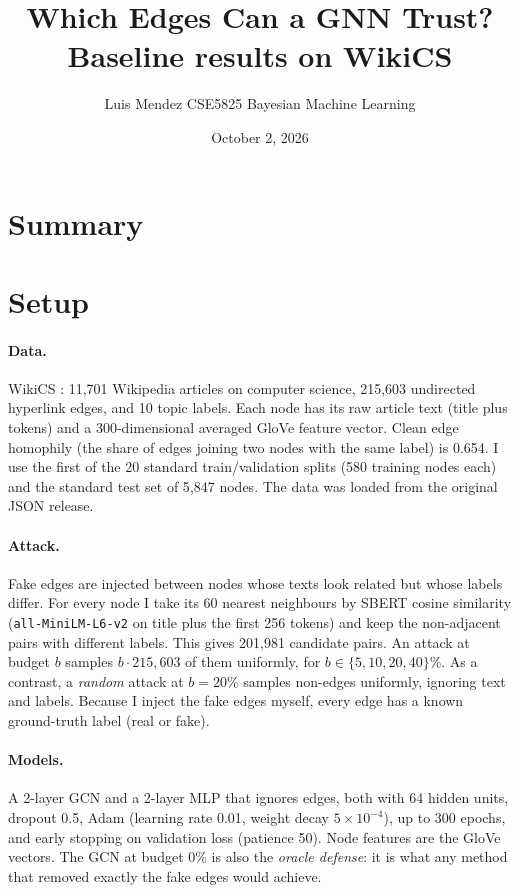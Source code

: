 \documentclass[11pt]{article}
\title{Which Edges Can a GNN Trust?\\[4pt]
\large Baseline results on WikiCS}
\author{Luis Mendez \quad CSE5825 Bayesian Machine Learning}
\date{October 2, 2026}
\begin{document}
\maketitle

\section{Summary}

\section{Setup}

\paragraph{Data.} WikiCS \cite{wikics}: 11{,}701 Wikipedia articles on computer science,
215{,}603 undirected hyperlink edges, and 10 topic labels. Each node has its raw article text
(title plus tokens) and a 300-dimensional averaged GloVe feature vector. Clean edge homophily
(the share of edges joining two nodes with the same label) is 0.654. I use the first
\nsplits{} of the 20 standard train/validation splits (580 training nodes each) and the
standard test set of 5{,}847 nodes. The data was loaded from the original JSON release.

\paragraph{Attack.} Fake edges are injected between nodes whose texts look related but whose
labels differ. For every node I take its 60 nearest neighbours by SBERT cosine similarity
(\texttt{all-MiniLM-L6-v2} on title plus the first 256 tokens) and keep the non-adjacent pairs
with different labels. This gives 201{,}981 candidate pairs. An attack at budget $b$ samples
$b \cdot 215{,}603$ of them uniformly, for $b \in \{5, 10, 20, 40\}\%$. As a contrast, a
\emph{random} attack at $b = 20\%$ samples non-edges uniformly, ignoring text and labels.
Because I inject the fake edges myself, every edge has a known ground-truth label (real or
fake).

\paragraph{Models.} A 2-layer GCN \cite{gcn} and a 2-layer MLP that ignores edges, both with
64 hidden units, dropout 0.5, Adam (learning rate 0.01, weight decay $5\times10^{-4}$), up to
300 epochs, and early stopping on validation loss (patience 50). Node features are the GloVe
vectors. The GCN at budget 0\% is also the \emph{oracle defense}: it is what any method that
removed exactly the fake edges would achieve.
\end{document}
